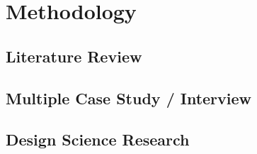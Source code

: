 \chapter{Methodology} \label{chapter3}

\section{Literature Review}

\section{Multiple Case Study / Interview}

\section{Design Science Research}